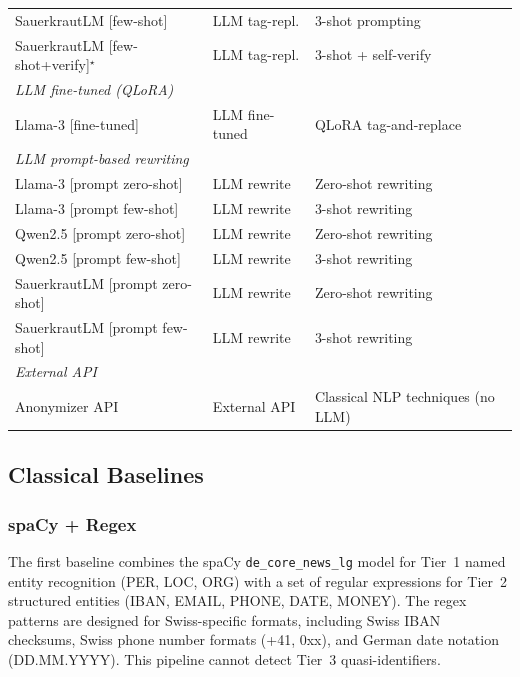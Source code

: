 \begin{table}[htbp]
\begin{tabular}{lll}
SauerkrautLM [few-shot]                & LLM tag-repl.  & 3-shot prompting \\
SauerkrautLM [few-shot+verify]$^\star$ & LLM tag-repl.  & 3-shot + self-verify \\
\midrule
\multicolumn{3}{l}{\textit{LLM fine-tuned (QLoRA)}} \\
Llama-3 [fine-tuned]                   & LLM fine-tuned & QLoRA tag-and-replace \\
\midrule
\multicolumn{3}{l}{\textit{LLM prompt-based rewriting}} \\
Llama-3 [prompt zero-shot]             & LLM rewrite    & Zero-shot rewriting \\
Llama-3 [prompt few-shot]              & LLM rewrite    & 3-shot rewriting \\
Qwen2.5 [prompt zero-shot]             & LLM rewrite    & Zero-shot rewriting \\
Qwen2.5 [prompt few-shot]              & LLM rewrite    & 3-shot rewriting \\
SauerkrautLM [prompt zero-shot]        & LLM rewrite    & Zero-shot rewriting \\
SauerkrautLM [prompt few-shot]         & LLM rewrite    & 3-shot rewriting \\
\midrule
\multicolumn{3}{l}{\textit{External API}} \\
Anonymizer API                         & External API   & Classical NLP techniques (no LLM) \\
\bottomrule
\end{tabular}
\end{table}


\subsection{Classical Baselines}
\label{sec:classical_baselines}

\subsubsection{spaCy + Regex}

The first baseline combines the spaCy \texttt{de\_core\_news\_lg} model
\citep{honnibal2020spacy} for Tier~1 named entity recognition (PER, LOC, ORG)
with a set of regular expressions for Tier~2 structured entities (IBAN, EMAIL,
PHONE, DATE, MONEY). The regex patterns are designed for Swiss-specific formats,
including Swiss IBAN checksums, Swiss phone number formats (+41, 0xx), and
German date notation (DD.MM.YYYY). This pipeline cannot detect Tier~3
quasi-identifiers.

